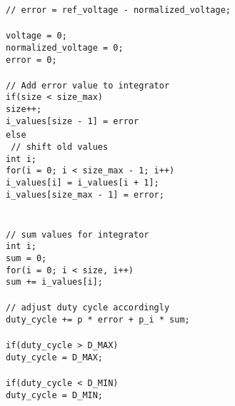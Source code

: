\documentclass[a4paper, 12pt]{article}
\begin{document}
\begin{appendices}
{{	\texttt{// error = ref\_voltage - normalized\_voltage;} \\\noindent
	\texttt{ \\\noindent}
	\texttt{voltage = 0;} \\\noindent
	\texttt{normalized\_voltage = 0;} \\\noindent
	\texttt{error = 0;} \\\noindent
	\texttt{ \\\noindent}
	\texttt{// Add error value to integrator} \\\noindent
	\texttt{if(size < size\_max)} \\\noindent
	\texttt{size++;} \\\noindent
	\texttt{i\_values[size - 1] = error} \\\noindent
	\texttt{else { \\\noindent}
	\texttt{// shift old values} \\\noindent
	\texttt{int i;} \\\noindent
	\texttt{for(i = 0; i < size\_max - 1; i++)} \\\noindent
	\texttt{i\_values[i] = i\_values[i + 1];} \\\noindent
	\texttt{i\_values[size\_max - 1] = error;} \\\noindent
	\texttt{}} \\\noindent
	\texttt{ \\\noindent}
	\texttt{// sum values for integrator} \\\noindent
	\texttt{int i;} \\\noindent
	\texttt{sum = 0;} \\\noindent
	\texttt{for(i = 0; i < size, i++)} \\\noindent
	\texttt{sum += i\_values[i];} \\\noindent
	\texttt{ \\\noindent}
	\texttt{// adjust duty cycle accordingly} \\\noindent
	\texttt{duty\_cycle += p * error + p\_i * sum;} \\\noindent
	\texttt{ \\\noindent}
	\texttt{if(duty\_cycle > D\_MAX)} \\\noindent
	\texttt{duty\_cycle = D\_MAX;} \\\noindent
	\texttt{ \\\noindent}
	\texttt{if(duty\_cycle < D\_MIN)} \\\noindent
	\texttt{duty\_cycle = D\_MIN;} \\\noindent
	\texttt{ \\\noindent}
}}
\end{appendices}
\end{document}
